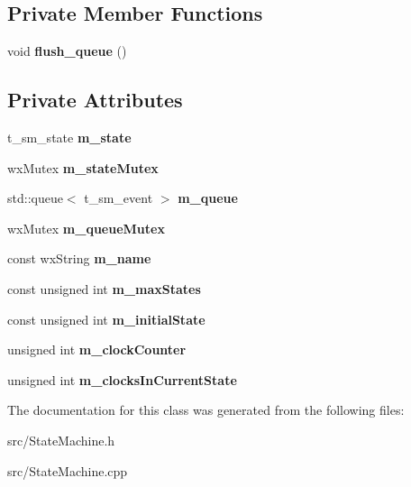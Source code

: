 \subsection*{Private Member Functions}
\begin{DoxyCompactItemize}
\item 
void {\bfseries flush\_\-queue} ()\label{classCStateMachine_ae3570a95f274c9ea661e0134ed09a47d}

\end{DoxyCompactItemize}
\subsection*{Private Attributes}
\begin{DoxyCompactItemize}
\item 
t\_\-sm\_\-state {\bfseries m\_\-state}\label{classCStateMachine_a9a94ee25ab9056f2246fdd16a9ec714f}

\item 
wxMutex {\bfseries m\_\-stateMutex}\label{classCStateMachine_a0616c5f1c87603c39a7748c29176ddaa}

\item 
std::queue$<$ t\_\-sm\_\-event $>$ {\bfseries m\_\-queue}\label{classCStateMachine_addedf381033f3f0afa5488a3937cd11d}

\item 
wxMutex {\bfseries m\_\-queueMutex}\label{classCStateMachine_aed8a2552b238c991b5139ae93f88091c}

\item 
const wxString {\bfseries m\_\-name}\label{classCStateMachine_a6a74c93357b88d77a00ffeac17d8805d}

\item 
const unsigned int {\bfseries m\_\-maxStates}\label{classCStateMachine_a1841f0a45b3da55d2e7cef014cca6abc}

\item 
const unsigned int {\bfseries m\_\-initialState}\label{classCStateMachine_a61042da399918f7a0dfcdde2fc76b307}

\item 
unsigned int {\bfseries m\_\-clockCounter}\label{classCStateMachine_af125751a6b33739b911d44c85657dc36}

\item 
unsigned int {\bfseries m\_\-clocksInCurrentState}\label{classCStateMachine_a7991b22d64e7082e2c2a491ad0f9ce7d}

\end{DoxyCompactItemize}


The documentation for this class was generated from the following files:\begin{DoxyCompactItemize}
\item 
src/StateMachine.h\item 
src/StateMachine.cpp\end{DoxyCompactItemize}
